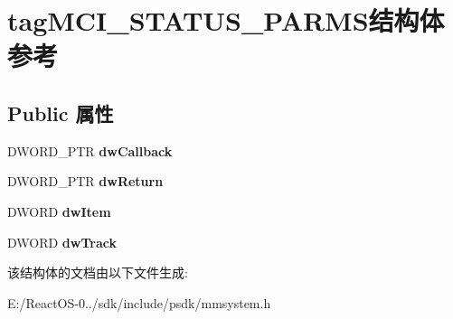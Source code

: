 \hypertarget{structtag_m_c_i___s_t_a_t_u_s___p_a_r_m_s}{}\section{tag\+M\+C\+I\+\_\+\+S\+T\+A\+T\+U\+S\+\_\+\+P\+A\+R\+M\+S结构体 参考}
\label{structtag_m_c_i___s_t_a_t_u_s___p_a_r_m_s}
\subsection*{Public 属性}
\begin{DoxyCompactItemize}
\item 
\mbox{\label{structtag_m_c_i___s_t_a_t_u_s___p_a_r_m_s_a8bde5d2f04185e5a61f6f48d33a4d317}} 
D\+W\+O\+R\+D\+\_\+\+P\+TR {\bfseries dw\+Callback}
\item 
\mbox{\label{structtag_m_c_i___s_t_a_t_u_s___p_a_r_m_s_a2db02f19435f8eb09c51f977f7f86215}} 
D\+W\+O\+R\+D\+\_\+\+P\+TR {\bfseries dw\+Return}
\item 
\mbox{\label{structtag_m_c_i___s_t_a_t_u_s___p_a_r_m_s_a5f8c587ae9a0ae724526b604149fd6dd}} 
D\+W\+O\+RD {\bfseries dw\+Item}
\item 
\mbox{\label{structtag_m_c_i___s_t_a_t_u_s___p_a_r_m_s_ad426a756ce337349a63cf1cd2320e53c}} 
D\+W\+O\+RD {\bfseries dw\+Track}
\end{DoxyCompactItemize}


该结构体的文档由以下文件生成\+:\begin{DoxyCompactItemize}
\item 
E\+:/\+React\+O\+S-\/0../sdk/include/psdk/mmsystem.\+h\end{DoxyCompactItemize}

